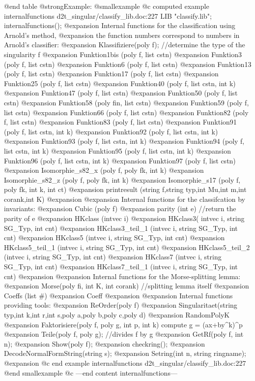 @end table
@strong{Example:}
@smallexample
@c computed example internalfunctions d2t_singular/classify_lib.doc:227 
LIB "classify.lib";
internalfunctions();
@expansion{}    Internal functions for the classification using Arnold's method,
@expansion{}    the function numbers correspond to numbers in Arnold's classifier:
@expansion{} Klassifiziere(poly f);      //determine the type of the singularity f
@expansion{}   Funktion1bis (poly f, list cstn)
@expansion{}   Funktion3 (poly f, list cstn)
@expansion{}   Funktion6 (poly f, list cstn)
@expansion{}   Funktion13 (poly f, list cstn)
@expansion{}   Funktion17 (poly f, list cstn)
@expansion{}   Funktion25 (poly f, list cstn)
@expansion{}   Funktion40 (poly f, list cstn, int k)
@expansion{}   Funktion47 (poly f, list cstn)
@expansion{}   Funktion50 (poly f, list cstn)
@expansion{}   Funktion58 (poly fin, list cstn)
@expansion{}   Funktion59 (poly f, list cstn)
@expansion{}   Funktion66 (poly f, list cstn)
@expansion{}   Funktion82 (poly f, list cstn)
@expansion{}   Funktion83 (poly f, list cstn)
@expansion{}   Funktion91 (poly f, list cstn, int k)
@expansion{}   Funktion92 (poly f, list cstn, int k)
@expansion{}   Funktion93 (poly f, list cstn, int k)
@expansion{}   Funktion94 (poly f, list cstn, int k)
@expansion{}   Funktion95 (poly f, list cstn, int k)
@expansion{}   Funktion96 (poly f, list cstn, int k)
@expansion{}   Funktion97 (poly f, list cstn)
@expansion{}   Isomorphie_s82_x (poly f, poly fk, int k)
@expansion{}   Isomorphie_s82_z (poly f, poly fk, int k)
@expansion{}   Isomorphie_s17 (poly f, poly fk, int k, int ct)
@expansion{}   printresult (string f,string typ,int Mu,int m,int corank,int K)
@expansion{}   
@expansion{}    Internal functions for the classifcation by invariants:
@expansion{}   Cubic (poly f)
@expansion{}   parity (int e)             //return the parity of e
@expansion{}   HKclass (intvec i)
@expansion{}   HKclass3( intvec i, string SG_Typ, int cnt)
@expansion{}   HKclass3_teil_1 (intvec i, string SG_Typ, int cnt)
@expansion{}   HKclass5 (intvec i, string SG_Typ, int cnt)
@expansion{}   HKclass5_teil_1 (intvec i, string SG_Typ, int cnt)
@expansion{}   HKclass5_teil_2 (intvec i, string SG_Typ, int cnt)
@expansion{}   HKclass7 (intvec i, string SG_Typ, int cnt)
@expansion{}   HKclass7_teil_1 (intvec i, string SG_Typ, int cnt)
@expansion{}   
@expansion{}    Internal functions for the Morse-splitting lemma:
@expansion{}   Morse(poly fi, int K, int corank)  //splitting lemma itself
@expansion{}   Coeffs (list #)
@expansion{}   Coeff
@expansion{}   
@expansion{}    Internal functions providing tools:
@expansion{}   ReOrder(poly f)
@expansion{}   Singularitaet(string typ,int k,int r,int s,poly a,poly b,poly c,poly d)
@expansion{}   RandomPolyK
@expansion{}   Faktorisiere(poly f, poly g, int p, int k)   compute g = (ax+by^k)^p
@expansion{}   Teile(poly f, poly g);             //divides f by g
@expansion{}   GetRf(poly f, int n);
@expansion{}   Show(poly f);
@expansion{}   checkring();
@expansion{}   DecodeNormalFormString(string s);
@expansion{}   Setring(int n, string ringname);
@expansion{}   
@c end example internalfunctions d2t_singular/classify_lib.doc:227
@end smallexample
@c ---end content internalfunctions---


